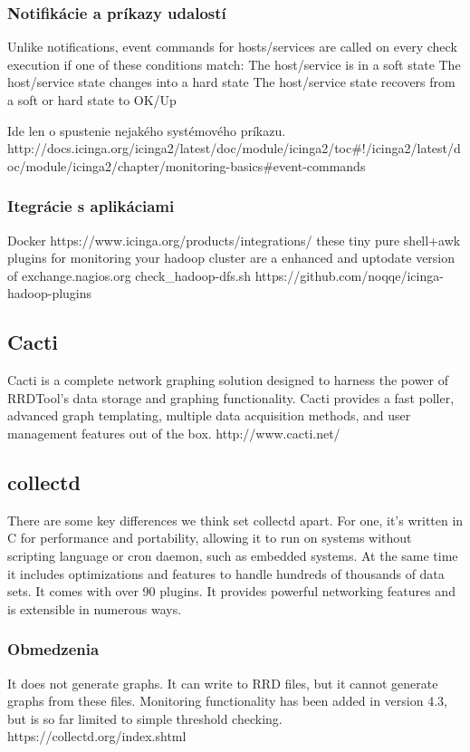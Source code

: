 \documentclass[11pt,final,oneside]{fithesis}
\begin{document}
\subsubsection{Notifikácie a príkazy udalostí}
Unlike notifications, event commands for hosts/services are called on every check execution if one of these conditions match:
The host/service is in a soft state
The host/service state changes into a hard state
The host/service state recovers from a soft or hard state to OK/Up

Ide len o spustenie nejakého systémového príkazu.
http://docs.icinga.org/icinga2/latest/doc/module/icinga2/toc#!/icinga2/latest/doc/module/icinga2/chapter/monitoring-basics#event-commands

\subsubsection{Itegrácie s aplikáciami} 
Docker
https://www.icinga.org/products/integrations/
these tiny pure shell+awk plugins for monitoring your hadoop cluster are a enhanced and uptodate version of exchange.nagios.org check_hadoop-dfs.sh
https://github.com/noqqe/icinga-hadoop-plugins

\subsection{Cacti} 
Cacti is a complete network graphing solution designed to harness the power of RRDTool's data storage and graphing functionality. Cacti provides a fast poller, advanced graph templating, multiple data acquisition methods, and user management features out of the box.
http://www.cacti.net/

\subsection{collectd}
There are some key differences we think set collectd apart. For one, it's written in C for performance and portability, allowing it to run on systems without scripting language or cron daemon, such as embedded systems. 
At the same time it includes optimizations and features to handle hundreds of thousands of data sets. It comes with over 90 plugins. It provides powerful networking features and is extensible in numerous ways. 

\subsubsection{Obmedzenia}
It does not generate graphs. It can write to RRD files, but it cannot generate graphs from these files. 
Monitoring functionality has been added in version 4.3, but is so far limited to simple threshold checking. 
https://collectd.org/index.shtml
\end{document}
